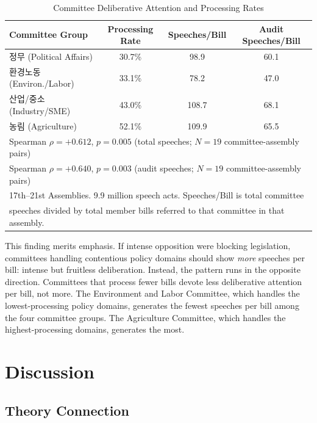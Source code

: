 \documentclass[11pt]{article}
\begin{document}
\begin{table}[htbp]
\centering
\caption{Committee Deliberative Attention and Processing Rates}
\label{tab:speech}
\begin{tabular}{lccc}
\toprule
Committee Group & Processing Rate & Speeches/Bill & Audit Speeches/Bill \\
\midrule
정무 (Political Affairs) & 30.7\% & 98.9 & 60.1 \\
환경노동 (Environ./Labor) & 33.1\% & 78.2 & 47.0 \\
산업/중소 (Industry/SME) & 43.0\% & 108.7 & 68.1 \\
농림 (Agriculture) & 52.1\% & 109.9 & 65.5 \\
\midrule
\multicolumn{4}{l}{Spearman $\rho = +0.612$, $p = 0.005$ (total speeches; $N = 19$ committee-assembly pairs)} \\
\multicolumn{4}{l}{Spearman $\rho = +0.640$, $p = 0.003$ (audit speeches; $N = 19$ committee-assembly pairs)} \\
\bottomrule
\multicolumn{4}{l}{\footnotesize 17th--21st Assemblies. 9.9 million speech acts. Speeches/Bill is total committee} \\
\multicolumn{4}{l}{\footnotesize speeches divided by total member bills referred to that committee in that assembly.} \\
\end{tabular}
\end{table}

This finding merits emphasis. If intense opposition were blocking legislation, committees handling contentious policy domains should show \emph{more} speeches per bill: intense but fruitless deliberation. Instead, the pattern runs in the opposite direction. Committees that process fewer bills devote less deliberative attention per bill, not more. The Environment and Labor Committee, which handles the lowest-processing policy domains, generates the fewest speeches per bill among the four committee groups. The Agriculture Committee, which handles the highest-processing domains, generates the most.



\section{Discussion}
\label{sec:discussion}

\subsection{Theory Connection}
\end{document}
